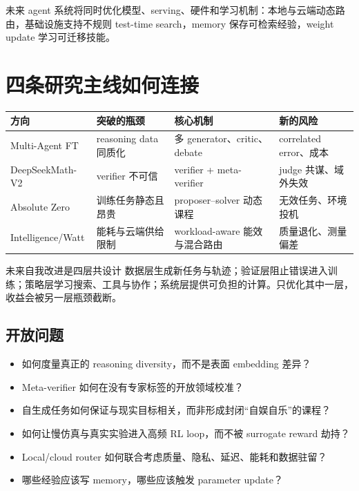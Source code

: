 \documentclass[a4paper]{article}
\begin{document}
未来 agent 系统将同时优化模型、serving、硬件和学习机制：本地与云端动态路由，基础设施支持不规则 test-time search，memory 保存可检索经验，weight update 学习可迁移技能。

\section{四条研究主线如何连接}

\begin{table}[H]
\centering
\small
\begin{tabular}{>{\raggedright\arraybackslash}p{3cm}>{\raggedright\arraybackslash}p{3.4cm}>{\raggedright\arraybackslash}p{3.7cm}>{\raggedright\arraybackslash}p{3.4cm}}
\toprule
\textbf{方向} & \textbf{突破的瓶颈} & \textbf{核心机制} & \textbf{新的风险} \\
\midrule
Multi-Agent FT & reasoning data 同质化 & 多 generator、critic、debate & correlated error、成本 \\
DeepSeekMath-V2 & verifier 不可信 & verifier + meta-verifier & judge 共谋、域外失效 \\
Absolute Zero & 训练任务静态且昂贵 & proposer--solver 动态课程 & 无效任务、环境投机 \\
Intelligence/Watt & 能耗与云端供给限制 & workload-aware 能效与混合路由 & 质量退化、测量偏差 \\
\bottomrule
\end{tabular}
\end{table}

\begin{importantbox}{未来自我改进是四层共设计}
数据层生成新任务与轨迹；验证层阻止错误进入训练；策略层学习搜索、工具与协作；系统层提供可负担的计算。只优化其中一层，收益会被另一层瓶颈截断。
\end{importantbox}

\subsection{开放问题}

\begin{itemize}
    \item 如何度量真正的 reasoning diversity，而不是表面 embedding 差异？
    \item Meta-verifier 如何在没有专家标签的开放领域校准？
    \item 自生成任务如何保证与现实目标相关，而非形成封闭“自娱自乐”的课程？
    \item 如何让慢仿真与真实实验进入高频 RL loop，而不被 surrogate reward 劫持？
    \item Local/cloud router 如何联合考虑质量、隐私、延迟、能耗和数据驻留？
    \item 哪些经验应该写 memory，哪些应该触发 parameter update？
\end{itemize}
\end{document}
